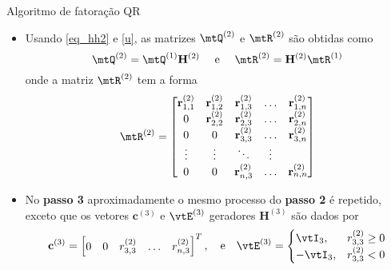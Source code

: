 \begin{frame}{Algoritmo de fatoração QR}
  \begin{itemize}\small
    \item Usando \eqref{eq_hh2} e \eqref{u}, as matrizes $\mtQ^{(2)}$ e $\mtR^{(2)}$ são obtidas como
    \begin{equation}
      \mtQ^{(2)} = \mtQ^{(1)}\mathbf{H}^{(2)} \quad \text{ e } \quad  \mtR^{(2)} = \mathbf{H}^{(2)}\mtR^{(1)}
    \end{equation}
    onde a matriz $\mtR^{(2)}$ tem a forma
    \begin{equation}
      \mtR^{(2)} =
      \left[\begin{matrix}
        \mathbf{r}^{(2)}_{1,1} & \mathbf{r}^{(2)}_{1,2} & \mathbf{r}^{(2)}_{1,3} & \ldots & \mathbf{r}^{(2)}_{1,n} \\
        0 & \mathbf{r}^{(2)}_{2,2} & \mathbf{r}^{(2)}_{2,3} & \ldots & \mathbf{r}^{(2)}_{2,n} \\
        0 & 0 & \mathbf{r}^{(2)}_{3,3} & \ldots & \mathbf{r}^{(2)}_{3,n} \\
        \vdots & \vdots & \ddots & \vdots \\
        0 & 0 & \mathbf{r}^{(2)}_{n,3} & \ldots & \mathbf{r}^{(2)}_{n,n}
      \end{matrix}\right]
    \end{equation}
    \item No \textbf{passo 3} aproximadamente o mesmo processo do \textbf{passo 2} é repetido, exceto que os vetores $\mathbf{c}^{(3)}$ e $\vtE^{(3)}$ geradores $\mathbf{H}^{(3)}$ são dados por
    \begin{equation}\label{eq_hh3}
      \mathbf{c}^{(3)} = \left[\begin{matrix}
        0 & 0 & r^{(2)}_{3,3} & \ldots & r^{(2)}_{n,3}
      \end{matrix}\right]^{T}, \quad \text{e} \quad
      \vtE^{(3)} =
      \begin{cases}
        \vtI_3, & r^{(2)}_{3,3} \geq 0 \\
        -\vtI_3, & r^{(2)}_{3,3} < 0
      \end{cases}
    \end{equation}
  \end{itemize}
\end{frame}

